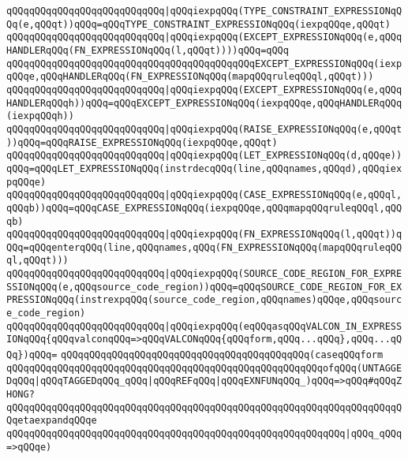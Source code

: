 \verb|qQQqqQQqqQQqqQQqqQQqqQQqqQQq|\verb#|qQQqiexpqQQq(TYPE_CONSTRAINT_EXPRESSIONqQQq(e,qQQqt))qQQq=qQQqTYPE_CONSTRAINT_EXPRESSIONqQQq(iexpqQQqe,qQQqt)#\newline
\verb|qQQqqQQqqQQqqQQqqQQqqQQqqQQq|\verb#|qQQqiexpqQQq(EXCEPT_EXPRESSIONqQQq(e,qQQqHANDLERqQQq(FN_EXPRESSIONqQQq(l,qQQqt))))qQQq=qQQq#\newline
\verb|qQQqqQQqqQQqqQQqqQQqqQQqqQQqqQQqqQQqqQQqqQQqEXCEPT_EXPRESSIONqQQq(iexpqQQqe,qQQqHANDLERqQQq(FN_EXPRESSIONqQQq(mapqQQqruleqQQql,qQQqt)))|\newline
\verb|qQQqqQQqqQQqqQQqqQQqqQQqqQQq|\verb#|qQQqiexpqQQq(EXCEPT_EXPRESSIONqQQq(e,qQQqHANDLERqQQqh))qQQq=qQQqEXCEPT_EXPRESSIONqQQq(iexpqQQqe,qQQqHANDLERqQQq(iexpqQQqh))#\newline
\verb|qQQqqQQqqQQqqQQqqQQqqQQqqQQq|\verb#|qQQqiexpqQQq(RAISE_EXPRESSIONqQQq(e,qQQqt))qQQq=qQQqRAISE_EXPRESSIONqQQq(iexpqQQqe,qQQqt)#\newline
\verb|qQQqqQQqqQQqqQQqqQQqqQQqqQQq|\verb#|qQQqiexpqQQq(LET_EXPRESSIONqQQq(d,qQQqe))qQQq=qQQqLET_EXPRESSIONqQQq(instrdecqQQq(line,qQQqnames,qQQqd),qQQqiexpqQQqe)#\newline
\verb|qQQqqQQqqQQqqQQqqQQqqQQqqQQq|\verb#|qQQqiexpqQQq(CASE_EXPRESSIONqQQq(e,qQQql,qQQqb))qQQq=qQQqCASE_EXPRESSIONqQQq(iexpqQQqe,qQQqmapqQQqruleqQQql,qQQqb)#\newline
\verb|qQQqqQQqqQQqqQQqqQQqqQQqqQQq|\verb#|qQQqiexpqQQq(FN_EXPRESSIONqQQq(l,qQQqt))qQQq=qQQqenterqQQq(line,qQQqnames,qQQq(FN_EXPRESSIONqQQq(mapqQQqruleqQQql,qQQqt)))#\newline
\verb|qQQqqQQqqQQqqQQqqQQqqQQqqQQq|\verb#|qQQqiexpqQQq(SOURCE_CODE_REGION_FOR_EXPRESSIONqQQq(e,qQQqsource_code_region))qQQq=qQQqSOURCE_CODE_REGION_FOR_EXPRESSIONqQQq(instrexpqQQq(source_code_region,qQQqnames)qQQqe,qQQqsource_code_region)#\newline
\verb|qQQqqQQqqQQqqQQqqQQqqQQqqQQq|\verb#|qQQqiexpqQQq(eqQQqasqQQqVALCON_IN_EXPRESSIONqQQq{qQQqvalconqQQq=>qQQqVALCONqQQq{qQQqform,qQQq...qQQq},qQQq...qQQq})qQQq=#\newline
\verb|qQQqqQQqqQQqqQQqqQQqqQQqqQQqqQQqqQQqqQQqqQQq(caseqQQqform|\newline
\verb|qQQqqQQqqQQqqQQqqQQqqQQqqQQqqQQqqQQqqQQqqQQqqQQqqQQqqQQqofqQQq(UNTAGGEDqQQq|\verb#|qQQqTAGGEDqQQq_qQQq|qQQqREFqQQq|qQQqEXNFUNqQQq_)qQQq=>qQQq#\verb|#qQQqZHONG?|\newline
\verb|qQQqqQQqqQQqqQQqqQQqqQQqqQQqqQQqqQQqqQQqqQQqqQQqqQQqqQQqqQQqqQQqqQQqqQQqetaexpandqQQqe|\newline
\verb|qQQqqQQqqQQqqQQqqQQqqQQqqQQqqQQqqQQqqQQqqQQqqQQqqQQqqQQqqQQq|\verb#|qQQq_qQQq=>qQQqe)#\newline
